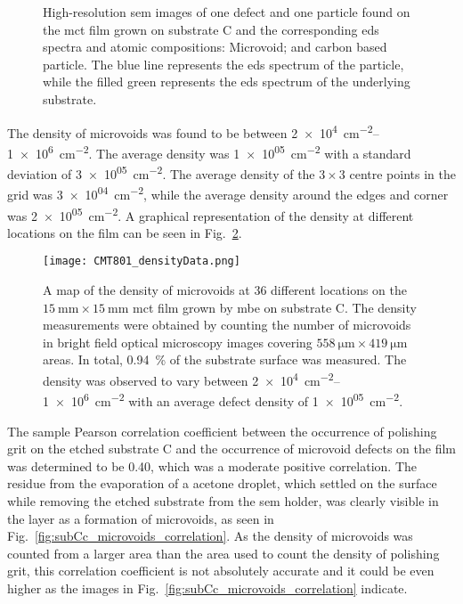 \begin{figure}[htbp]
\begin{subfigure}[t]{\textwidth}
\begin{minipage}[c]{0.11\linewidth}
            \atomicTable[\ce{C}&\SI{77.12}{}][\ce{Te}&\SI{10.27}{}][\ce{Hg}&\SI{8.17}{}][\ce{O}&\SI{2.12}{}][\ce{Cd}&\SI{1.95}{}][\ce{Al}&\SI{0.37}{}]
          \end{minipage}
    \end{subfigure}
    \caption[\Ac{sem} images, \ac{eds} spectra, and \ac{eds} atomic compositions of one particle and one defect found on \ac{mct} film grown on substrate C.]{High-resolution \ac{sem} images of one defect and one particle found on the \ac{mct} film grown on substrate C and the corresponding \ac{eds} spectra and atomic compositions:  Microvoid; and  carbon based particle. The blue line represents the \ac{eds} spectrum of the particle, while the filled green represents the \ac{eds} spectrum of the underlying substrate.}\label{fig:subCc_sem_w_eds}
\end{figure}

The density of microvoids was found to be between \SIrange{2e+4}{1e+6}{\centi\metre^{-2}}. The average density was \SI{1e+05}{\centi\metre^{-2}} with a standard deviation of \SI{3e+05}{\centi\metre^{-2}}. The average density of the $3\times3$ centre points in the grid was \SI{3e+04}{\centi\metre^{-2}}, while the average density around the edges and corner was \SI{2e+05}{\centi\metre^{-2}}. A graphical representation of the density at different locations on the film can be seen in Fig.~\ref{fig:CMT801_densityData}. 

\begin{figure}[htbp]
    \centering
    \texttt{[image: CMT801\_densityData.png]}
    \caption[Map of the density of microvoids on the \ac{mct} film grown on substrate C.]{A map of the density of microvoids at 36 different locations on the $\SI{15}{\milli\metre}\times\SI{15}{\milli\metre}$ \ac{mct} film grown by \ac{mbe} on substrate C. The density measurements were obtained by counting the number of microvoids in bright field optical microscopy images covering $\SI{558}{\micro\metre}\times\SI{419}{\micro\metre}$ areas. In total, \SI{0.94}{\percent} of the substrate surface was measured. The density was observed to vary between \SIrange{2e+4}{1e+6}{\centi\metre^{-2}} with an average defect density of \SI{1e+05}{\centi\metre^{-2}}.}
    \label{fig:CMT801_densityData}
\end{figure}

The sample Pearson correlation coefficient between the occurrence of polishing grit on the etched substrate C and the occurrence of microvoid defects on the film was determined to be \SI{0.40}{}, which was a moderate positive correlation. The residue from the evaporation of a acetone droplet, which settled on the surface while removing the etched substrate from the \ac{sem} holder, was clearly visible in the layer as a formation of microvoids, as seen in Fig.~\ref{fig:subCc_microvoids_correlation}. As the density of microvoids was counted from a larger area than the area used to count the density of polishing grit, this correlation coefficient is not absolutely accurate and it could be even higher as the images in Fig.~\ref{fig:subCc_microvoids_correlation} indicate.

